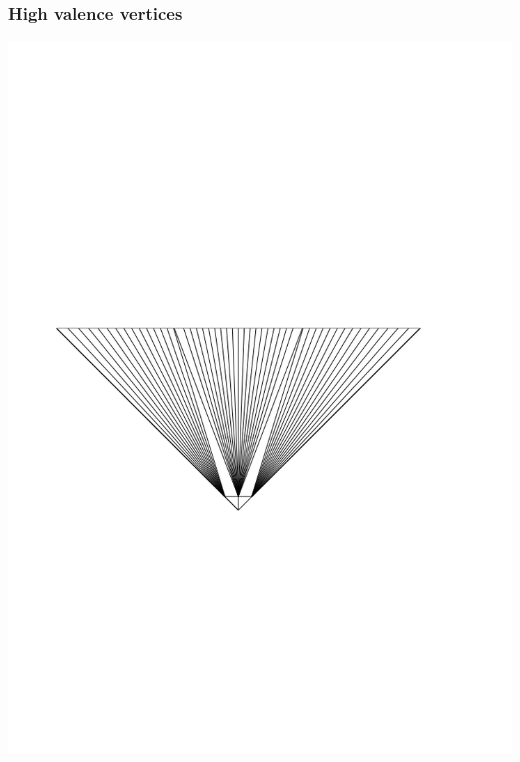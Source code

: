 \documentclass[14pt]{beamer}
\begin{document}
\begin{frame}
\frametitle{High valence vertices}
\begin{center}
\includegraphics[scale=0.6, trim = 0 0 0 300]{HV_2.png}
\end{center}
\end{frame}
\end{document}
